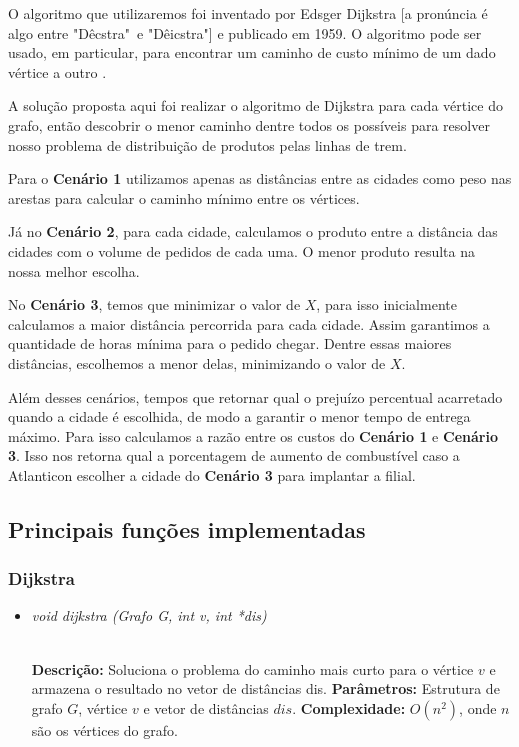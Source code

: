 \documentclass[12pt]{article}
\begin{document}
	O algoritmo que utilizaremos foi inventado por Edsger Dijkstra [a pronúncia é algo entre "Dêcstra"\ e "Dêicstra"] e publicado em 1959. O algoritmo pode ser usado, em particular, para encontrar um caminho de custo mínimo de um dado vértice a outro \cite{sedgewick}.

	A solução proposta aqui foi realizar o algoritmo de Dijkstra para cada vértice do grafo, então descobrir o menor caminho dentre todos os possíveis para resolver nosso problema de distribuição de produtos pelas linhas de trem.

	Para o \textbf{Cenário 1} utilizamos apenas as distâncias entre as cidades como peso nas arestas para calcular o caminho mínimo entre os vértices.

	Já no \textbf{Cenário 2}, para cada cidade, calculamos o produto entre a distância das cidades com o volume de pedidos de cada uma. O menor produto resulta na nossa melhor escolha.

	No \textbf{Cenário 3}, temos que minimizar o valor de $X$, para isso inicialmente calculamos a maior distância percorrida para cada cidade. Assim garantimos a quantidade de horas mínima para o pedido chegar. Dentre essas maiores distâncias, escolhemos a menor delas, minimizando o valor de $X$.

	Além desses cenários, tempos que retornar qual o prejuízo percentual acarretado quando a cidade é escolhida, de modo a garantir o menor tempo de entrega máximo. Para isso calculamos a razão entre os custos do \textbf{Cenário 1} e \textbf{Cenário 3}. Isso nos retorna qual a porcentagem de aumento de combustível caso a Atlanticon escolher a cidade do \textbf{Cenário 3} para implantar a filial.

\subsection{Principais funções implementadas}

\subsubsection{Dijkstra}

\begin{itemize}
 \item \begin{large}\textit{void dijkstra (Grafo G, int v,  int *dis)}\end{large}\\
 \subitem \textbf{Descrição:} Soluciona o problema do caminho mais curto para o vértice $v$ e armazena o resultado no vetor de distâncias dis.
 \subitem \textbf{Parâmetros:} Estrutura de grafo $G$, vértice $v$ e vetor de distâncias $dis$.
 \subitem \textbf{Complexidade:} $O(n^2)$, onde $n$ são os vértices do grafo.
\end{itemize}
\end{document}
